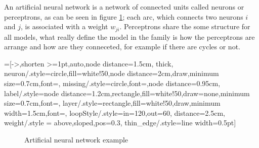  
An artificial neural network is a network of connected units called neurons or perceptrons, as can be seen in figure \ref{fully_connected}; each arc, which connects two neurons $i$ and $j$, is associated with a weight $w_{ji}$. Perceptrons share the some
structure for all models, what really define the model in the family is how the perceptrons are arrange and how are they conneceted, for example if there are cycles or not.


=[->,shorten >=1pt,auto,node distance=1.5cm,
  thick,
  neuron/.style={circle,fill=white!50,node distance=2cm,draw,minimum size=0.7cm,font=\sffamily\normalsize},
  missing/.style={circle,font=\sffamily\Large,node distance=0.95cm},
  label/.style={node distance=1.2cm,rectangle,fill=white!50,draw=none,minimum size=0.7cm,font=\sffamily\normalsize},
  layer/.style={rectangle,fill=white!50,draw,minimum width=1.5cm,font=\sffamily\Large},
  loopStyle/.style={in=120,out=60, distance=2.5cm},
  weight/.style = {above,sloped,pos=0.3},
  thin_edge/.style={line width=0.5pt}]
\begin{figure}
 \centering
{}
\caption{Artificial neural network example}
\label{fully_connected}
\end{figure}


